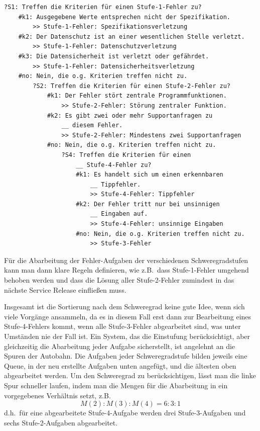 \begin{verbatim}
?S1: Treffen die Kriterien für einen Stufe-1-Fehler zu?    
    #k1: Ausgegebene Werte entsprechen nicht der Spezifikation.
        >> Stufe-1-Fehler: Spezifikationsverletzung
    #k2: Der Datenschutz ist an einer wesentlichen Stelle verletzt.
        >> Stufe-1-Fehler: Datenschutzverletzung
    #k3: Die Datensicherheit ist verletzt oder gefährdet.
        >> Stufe-1-Fehler: Datensicherheitsverletzung
    #no: Nein, die o.g. Kriterien treffen nicht zu.
        ?S2: Treffen die Kriterien für einen Stufe-2-Fehler zu?
            #k1: Der Fehler stört zentrale Programmfunktionen.
                >> Stufe-2-Fehler: Störung zentraler Funktion.
            #k2: Es gibt zwei oder mehr Supportanfragen zu 
                __ diesem Fehler.
                >> Stufe-2-Fehler: Mindestens zwei Supportanfragen
            #no: Nein, die o.g. Kriterien treffen nicht zu.
                ?S4: Treffen die Kriterien für einen 
                    __ Stufe-4-Fehler zu?
                    #k1: Es handelt sich um einen erkennbaren
                        __ Tippfehler.
                        >> Stufe-4-Fehler: Tippfehler
                    #k2: Der Fehler tritt nur bei unsinnigen
                        __ Eingaben auf.
                        >> Stufe-4-Fehler: unsinnige Eingaben
                    #no: Nein, die o.g. Kriterien treffen nicht zu.
                        >> Stufe-3-Fehler
\end{verbatim}

Für die Abarbeitung der Fehler-Aufgaben der verschiedenen Schweregradstufen kann man dann klare Regeln definieren, wie z.B.\ dass Stufe-1-Fehler umgehend behoben werden und dass die Lösung aller Stufe-2-Fehler zumindest in das nächste Service Release einfließen muss.

Insgesamt ist die Sortierung nach dem Schweregrad keine gute Idee, wenn sich viele Vorgänge ansammeln, da es in diesem Fall erst dann zur Bearbeitung eines Stufe-4-Fehlers kommt, wenn alle Stufe-3-Fehler abgearbeitet sind, was unter Umständen nie der Fall ist. Ein System, das die Einstufung berücksichtigt, aber gleichzeitig die Abarbeitung jeder Aufgabe sicherstellt, ist angelehnt an die Spuren der Autobahn. Die Aufgaben jeder Schweregradstufe bilden jeweils eine Queue, in der neu erstellte Aufgaben unten angefügt, und die ältesten oben abgearbeitet werden. Um den Schweregrad zu berücksichtigen, lässt man die linke Spur schneller laufen, indem man die Mengen für die Abarbeitung in ein vorgegebenes Verhältnis setzt, z.B.
\[M(2):M(3):M(4) = 6 : 3 : 1\]
d.h.\ für eine abgearbeitete Stufe-4-Aufgabe werden drei Stufe-3-Aufgaben und sechs Stufe-2-Aufgaben abgearbeitet.

